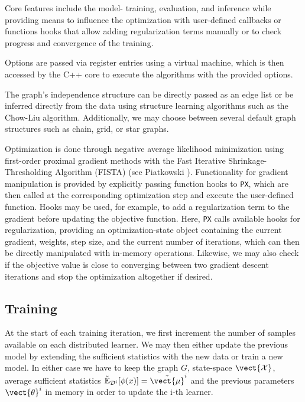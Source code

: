 Core features include the model- training, evaluation, and inference while providing means to influence the optimization with user-defined callbacks or functions hooks that allow adding regularization terms manually or to check progress and convergence of the training.

Options are passed via register entries using a virtual machine, which is then accessed by the C++ core to execute the algorithms with the provided options.

The graph's independence structure can be directly passed as an edge list or be inferred directly from the data using structure learning algorithms such as the Chow-Liu algorithm.
Additionally, we may choose between several default graph structures such as chain, grid, or star graphs.

Optimization is done through negative average likelihood minimization using first-order proximal gradient methods with the Fast Iterative Shrinkage-Thresholding Algorithm (FISTA) (see Piatkowski \cite{piatkowski2018exponential}).
Functionality for gradient manipulation is provided by explicitly passing function hooks to \texttt{PX}, which are then called at the corresponding optimization step and execute the user-defined function.
Hooks may be used, for example, to add a regularization term to the gradient before updating the objective function. 
Here, \texttt{PX} calls available hooks for regularization, providing an optimization-state object containing the current gradient, weights, step size, and the current number of iterations, which can then be directly manipulated with in-memory operations.
Likewise, we may also check if the objective value is close to converging between two gradient descent iterations and stop the optimization altogether if desired.

\subsection{Training}
At the start of each training iteration, we first increment the number of samples available on each distributed learner. 
We may then either update the previous model by extending the sufficient statistics with the new data or train a new model. 
In either case we  have to keep the graph $G$, state-space $\vect{\mathcal{X}}$, average sufficient statistics $\tilde{\mathbb{E}}_{\mathcal{D}^i}[\phi(x)] = \tilde{\vect{\mu}}^i$ and the previous parameters $\vect{\theta}^i$ in memory in order to update the i-th learner.

